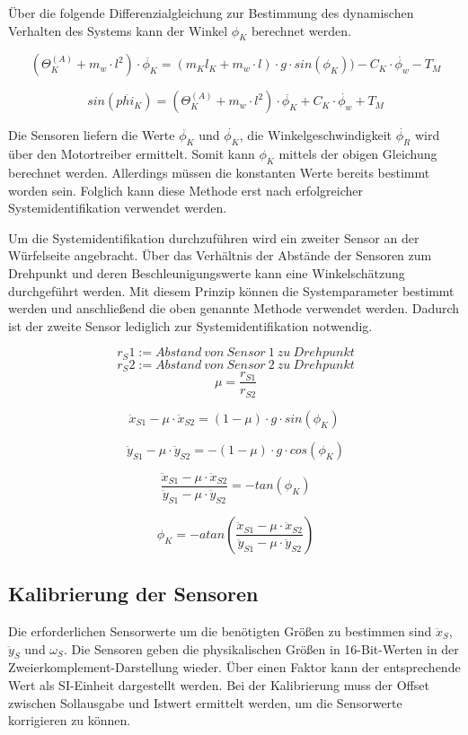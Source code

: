 \documentclass{article}
\begin{document}
Über die folgende Differenzialgleichung zur Bestimmung des dynamischen Verhalten des Systems kann der Winkel $\phi_K$ berechnet werden.

\[\ (\Theta_K^{(A)} + m_w \cdot l^2) \cdot \ddot{\phi_K} = (m_K  l_K + m_w \cdot l) \cdot g \cdot sin(\phi_K)) - C_K \cdot \dot{\phi_w} - T_M  \]

\[\ sin(\ddot{phi_K}) = (\Theta_K^{(A)} + m_w \cdot l^2) \cdot \ddot{\phi_K} + C_K \cdot \dot{\phi_w} + T_M \]

Die Sensoren liefern die Werte $\ddot{\phi_K}$ und $\dot{\phi_K}$, die Winkelgeschwindigkeit $\dot{\phi_R}$ wird über den Motortreiber ermittelt. Somit kann $\phi_K$ mittels der obigen Gleichung berechnet werden. Allerdings müssen die konstanten Werte bereits bestimmt worden sein. Folglich kann diese Methode erst nach erfolgreicher Systemidentifikation verwendet werden.

Um die Systemidentifikation durchzuführen wird ein zweiter Sensor an der Würfelseite angebracht. Über das Verhältnis der Abstände der Sensoren zum Drehpunkt und deren Beschleunigungswerte kann eine Winkelschätzung durchgeführt werden. Mit diesem Prinzip können die Systemparameter bestimmt werden und anschließend die oben genannte Methode verwendet werden. Dadurch ist der zweite Sensor lediglich zur Systemidentifikation notwendig.

\[\ r_S1 := Abstand \ von \ Sensor \ 1 \ zu \ Drehpunkt \]
\[\ r_S2 := Abstand \ von \ Sensor \ 2 \ zu \ Drehpunkt \]
\[\ \mu = \frac{r_{S1}}{r_{S2}} \]

\[ \ddot{x}_{S1} - \mu \cdot \ddot{x}_{S2} = (1 - \mu) \cdot g \cdot sin(\phi_K) \]

\[\ \ddot{y}_{S1} - \mu \cdot \ddot{y}_{S2} = - (1 - \mu) \cdot g \cdot cos(\phi_K) \]

\[\ \frac{\ddot{x}_{S1} - \mu \cdot \ddot{x}_{S2}}{\ddot{y}_{S1} - \mu \cdot \ddot{y}_{S2}} = 
-tan(\phi_K) \]

\[\ \phi_K = - atan(\frac{\ddot{x}_{S1} - \mu \cdot \ddot{x}_{S2}}{\ddot{y}_{S1} - \mu \cdot \ddot{y}_{S2}}) \]


\subsection{Kalibrierung der Sensoren}
Die erforderlichen Sensorwerte um die benötigten Größen zu bestimmen sind $\ddot{x}_S$, $\ddot{y}_S$ und $\omega_S$. Die Sensoren geben die physikalischen Größen in 16-Bit-Werten in der Zweierkomplement-Darstellung wieder. Über einen Faktor kann der entsprechende Wert als SI-Einheit dargestellt werden. Bei der Kalibrierung muss der Offset zwischen Sollausgabe und Istwert ermittelt werden, um die Sensorwerte korrigieren zu können.
\end{document}
